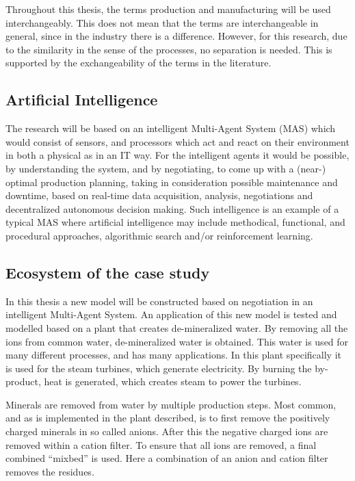 Throughout this thesis, the terms production and manufacturing will be used interchangeably. This does not mean that the terms are interchangeable in general, since in the industry there is a difference. However, for this research, due to the similarity in the sense of the processes, no separation is needed. This is supported by the exchangeability of the terms in the literature. 

\subsection{Artificial Intelligence}
The research will be based on an intelligent Multi-Agent System (MAS) which would consist of sensors, and processors which act and react on their environment in both a physical as in an IT way. For the intelligent agents it would be possible, by understanding the system, and by negotiating, to come up with a (near-) optimal production planning, taking in consideration possible maintenance and downtime, based on real-time data acquisition, analysis, negotiations and decentralized autonomous decision making. Such intelligence is an example of a typical MAS where artificial intelligence may include methodical, functional, and procedural approaches, algorithmic search and/or reinforcement learning. 

\subsection{Ecosystem of the case study}
\label{sec:intro_ecosystem}
In this thesis a new model will be constructed based on negotiation in an intelligent Multi-Agent System. An application of this new model is tested and modelled based on a plant that creates de-mineralized water. By removing all the ions from common water, de-mineralized water is obtained. This water is used for many different processes, and has many applications. In this plant specifically it is used for the steam turbines, which generate electricity. By burning the by-product, heat is generated, which creates steam to power the turbines. 

Minerals are removed from water by multiple production steps. Most common, and as is implemented in the plant described, is to first remove the positively charged minerals in so called anions. After this the negative charged ions are removed within a cation filter. To ensure that all ions are removed, a final combined ``mixbed'' is used. Here a combination of an anion and cation filter removes the residues.

